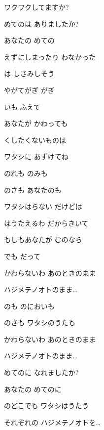 \documentclass[14pt]{ltjsarticle}
\begin{document}
{  ワクワクしてますか?
  \jisho{}

\item
  めてのは ありましたか?
  \jisho{}

  あなたの めての
  \jisho{}

  えずにしまったり わなかった
  \jisho{}

  は しさみしそう
  \jisho{}

\item
  やがてがぎ がぎ
  \jisho{}

  いも ふえて
  \jisho{}

  あなたが かわっても
  \jisho{}

  くしたくないものは
  \jisho{}

  ワタシに あずけてね
  \jisho{}

\item
  のれも のみも
  \jisho{}

  のさも あなたのも
  \jisho{}

  ワタシはらない だけどは
  \jisho{}

  はうたえるわ だからきいて
  \jisho{}

\item
  もしもあなたが むのなら
  \jisho{}

  でも だって
  \jisho{}

  かわらないわ あのときのまま
  \jisho{}

  ハジメテノオトのまま…
  \jisho{}

\item
  のも のにおいも
  \jisho{}

  のさも ワタシのうたも
  \jisho{}

  かわらないわ あのときのまま
  \jisho{}

  ハジメテノオトのまま…
  \jisho{}

\item
  めてのに なれましたか?
  \jisho{}

  あなたの めてのに
  \jisho{}

\item
  のどこでも ワタシはうたう
  \jisho{}

  それぞれの ハジメテノオトを…
  \jisho{}

  
}
\end{document}
